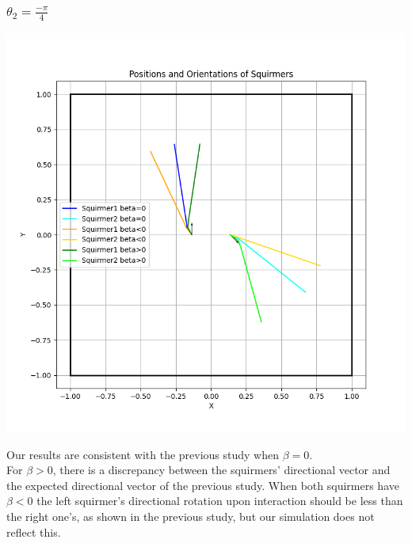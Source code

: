 \documentclass{article}
\begin{document}
\subsubsection{$\theta_2 = \frac{-\pi}{4}$}
\begin{center}
   \includegraphics[width=1\textwidth]{graphs/simulations/twosquirmerinter/sq2.-pi.4.png}
\end{center}
Our results are consistent with the previous study when $\beta = 0$.\\
For $\beta > 0$, there is a discrepancy between the squirmers' directional vector and the expected
directional vector of the previous study. When both squirmers have $\beta < 0$ 
the left squirmer's directional rotation upon interaction should be less than the right one's, 
as shown in the previous study, but our simulation does not reflect this.
\end{document}
